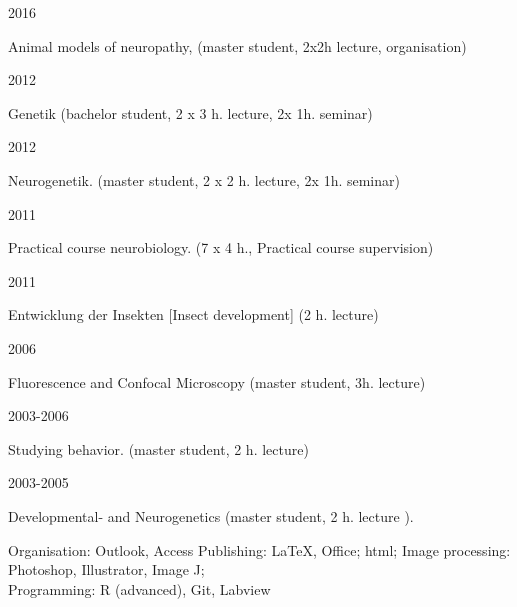 \parbox{0.15\textwidth}{2016}\hfill
\parbox[t]{0.83\textwidth}{Animal models of neuropathy, (master student, 2x2h lecture, organisation)}

\parbox{0.15\textwidth}{2012}\hfill
\parbox[t]{0.83\textwidth}{Genetik (bachelor student, 2 x 3 h. lecture, 2x 1h. seminar)}
\parbox{0.15\textwidth}{2012}\hfill
\parbox[t]{0.83\textwidth}{Neurogenetik. (master student, 2 x 2 h. lecture, 2x 1h. seminar)}
\parbox{0.15\textwidth}{2011}\hfill
\parbox[t]{0.83\textwidth}{Practical course neurobiology. (7 x 4 h., Practical course supervision)}
\parbox{0.15\textwidth}{2011}\hfill
\parbox[t]{0.83\textwidth}{Entwicklung der Insekten [Insect development] (2 h. lecture)}
 
\parbox{0.15\textwidth}{2006}\hfill
\parbox[t]{0.83\textwidth}{Fluorescence and Confocal Microscopy (master student, 3h. lecture)}
\parbox{0.15\textwidth}{2003-2006}\hfill
\parbox[t]{0.83\textwidth}{Studying behavior. (master student, 2 h. lecture)}
\parbox{0.15\textwidth}{2003-2005}\hfill
\parbox[t]{0.83\textwidth}{Developmental- and Neurogenetics %
(master student, 2 h. lecture%
).}


%
%
%
%
%
%
%
%
%
%
%
%
%
%
Organisation: Outlook, Access
Publishing: \LaTeX, Office; html;
 Image processing: Photoshop, Illustrator, Image J; 
\\Programming:  R (advanced), Git, Labview

